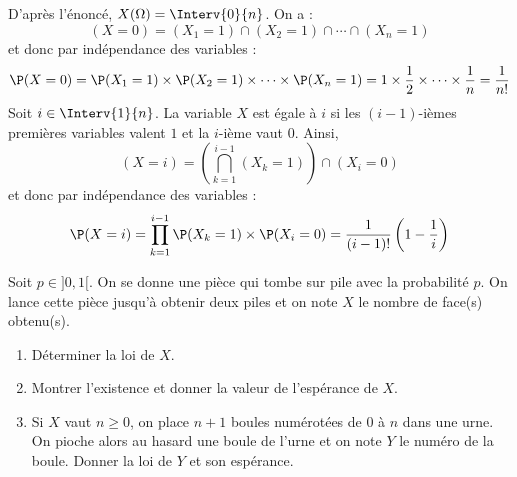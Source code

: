 \documentclass[a4paper,10pt]{report}
\begin{document}
\corr  D'après l'énoncé, $X(\Omega) = \Interv{0}{n}$. On a :
$$ (X=0)= (X_1=1) \cap (X_2=1) \cap \cdots \cap (X_n=1)$$
et donc par indépendance des variables :
$$ \P(X=0) = \P(X_1=1) \times \P(X_2=1) \times \cdots \times \P(X_n=1) = 1 \times \dfrac{1}{2} \times \cdots \times \dfrac{1}{n} = \dfrac{1}{n!} $$
Soit $i \in \Interv{1}{n}$. La variable $X$ est égale à $i$ si les $(i-1)$-ièmes premières variables valent $1$ et la $i$-ième vaut $0$. Ainsi,
$$(X=i) = \left(\bigcap_{k=1}^{i-1} (X_k=1)\right) \cap (X_i=0)$$
et donc par indépendance des variables :
$$ \P(X=i) = \prod_{k=1}^{i-1} \P(X_k=1) \times \P(X_i=0) = \dfrac{1}{(i-1)!} \left(1 - \dfrac{1}{i}\right)$$

\begin{Exercice}{} Soit $p \in ]0,1[$. On se donne une pièce qui tombe sur pile avec la probabilité $p$. On lance cette pièce jusqu'à obtenir deux piles et on note $X$ le nombre de face(s) obtenu(s).

\begin{enumerate}
\item Déterminer la loi de $X$.
\item Montrer l'existence et donner la valeur de l'espérance de $X$.
\item Si $X$ vaut $n \geq 0$, on place $n+1$ boules numérotées de $0$ à $n$ dans une urne. On pioche alors au hasard une boule de l'urne et on note $Y$ le numéro de la boule. Donner la loi de $Y$ et son espérance.
\end{enumerate}   
\end{Exercice}
\end{document}

